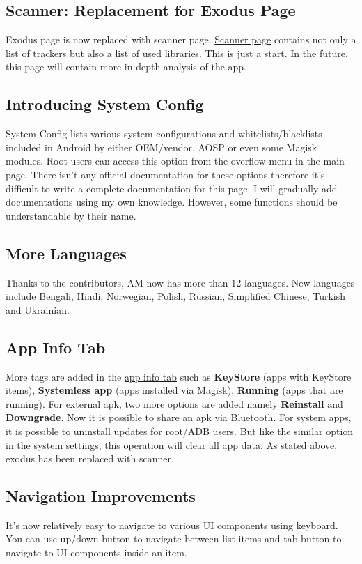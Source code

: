 \subsection{Scanner: Replacement for Exodus Page}
Exodus page is now replaced with scanner page. \hyperref[sec:scanner-page]{Scanner page} contains not only a list of
trackers but also a list of used libraries. This is just a start. In the future, this page will contain more in depth
analysis of the app.

\subsection{Introducing System Config}
System Config lists various system configurations and whitelists/blacklists included in Android by either OEM/vendor,
AOSP or even some Magisk modules. Root users can access this option from the overflow menu in the main page.
There isn't any official documentation for these options therefore it's difficult to write a complete documentation
for this page. I will gradually add documentations using my own knowledge. However, some functions should be
understandable by their name.

\subsection{More Languages}
Thanks to the contributors, AM now has more than 12 languages. New languages include Bengali, Hindi, Norwegian, Polish,
Russian, Simplified Chinese, Turkish and Ukrainian.

\subsection{App Info Tab}
More tags are added in the \hyperref[subsec:app-info-tab]{app info tab} such as \textbf{KeyStore} (apps with KeyStore
items), \textbf{Systemless app} (apps installed via Magisk), \textbf{Running} (apps that are running). For external apk,
two more options are added namely \textbf{Reinstall} and \textbf{Downgrade}. Now it is possible to share an apk via
Bluetooth. For system apps, it is possible to uninstall updates for root/ADB users. But like the similar option in the
system settings, this operation will clear all app data. As stated above, exodus has been replaced with scanner.

\subsection{Navigation Improvements}
It's now relatively easy to navigate to various UI components using keyboard. You can use up/down button to navigate
between list items and tab button to navigate to UI components inside an item.

